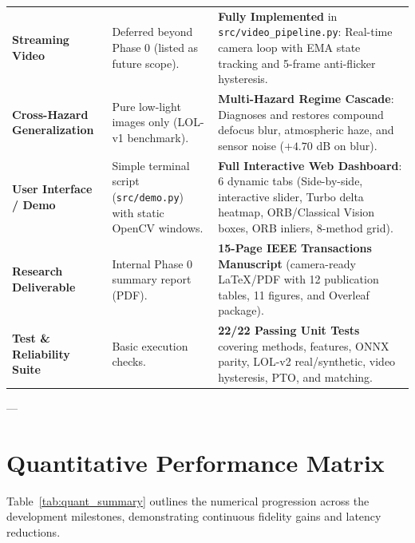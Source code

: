 \documentclass[10pt,a4paper]{article}
\begin{document}
\begin{table}[htbp]
\begin{tabularx}{\textwidth}{p{3.2cm} p{5.5cm} X}
\addlinespace
\textbf{Streaming Video} & 
Deferred beyond Phase 0 (listed as future scope). & 
\textbf{Fully Implemented} in \texttt{src/video\_pipeline.py}: Real-time camera loop with EMA state tracking and 5-frame anti-flicker hysteresis. \\
\addlinespace
\textbf{Cross-Hazard Generalization} & 
Pure low-light images only (LOL-v1 benchmark). & 
\textbf{Multi-Hazard Regime Cascade}: Diagnoses and restores compound defocus blur, atmospheric haze, and sensor noise ($+4.70$ dB on blur). \\
\addlinespace
\textbf{User Interface / Demo} & 
Simple terminal script (\texttt{src/demo.py}) with static OpenCV windows. & 
\textbf{Full Interactive Web Dashboard}: 6 dynamic tabs (Side-by-side, interactive slider, Turbo delta heatmap, ORB/Classical Vision boxes, ORB inliers, 8-method grid). \\
\addlinespace
\textbf{Research Deliverable} & 
Internal Phase 0 summary report (PDF). & 
\textbf{15-Page IEEE Transactions Manuscript} (camera-ready LaTeX/PDF with 12 publication tables, 11 figures, and Overleaf package). \\
\addlinespace
\textbf{Test \& Reliability Suite} & 
Basic execution checks. & 
\textbf{22/22 Passing Unit Tests} covering methods, features, ONNX parity, LOL-v2 real/synthetic, video hysteresis, PTO, and matching. \\
\bottomrule
\end{tabularx}
\end{table}

---

\section{Quantitative Performance Matrix}

Table~\ref{tab:quant_summary} outlines the numerical progression across the development milestones, demonstrating continuous fidelity gains and latency reductions.
\end{document}
